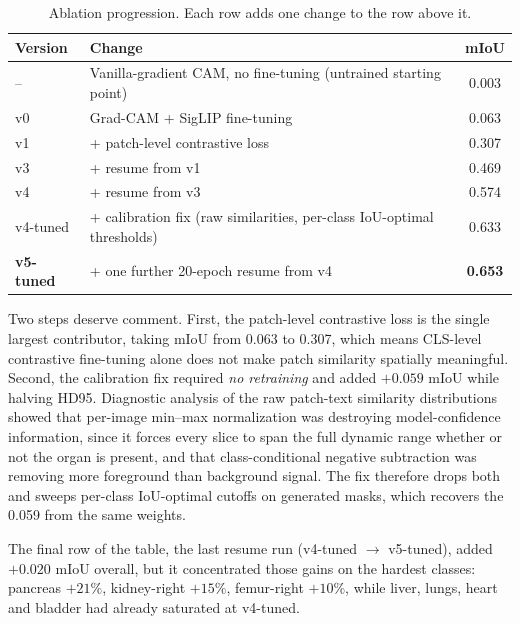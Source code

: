 \begin{table}[t]
\centering
\caption{Ablation progression. Each row adds one change to the row above it.}
\label{tab:progression}
\begin{tabular}{llc}
\toprule
Version & Change & mIoU \\
\midrule
--         & Vanilla-gradient CAM, no fine-tuning (untrained starting point) & 0.003 \\
v0         & Grad-CAM + SigLIP fine-tuning                                   & 0.063 \\
v1         & \quad + patch-level contrastive loss                            & 0.307 \\
v3         & \quad + resume from v1                                          & 0.469 \\
v4         & \quad + resume from v3                                          & 0.574 \\
v4-tuned   & \quad + calibration fix (raw similarities, per-class IoU-optimal thresholds) & 0.633 \\
\textbf{v5-tuned} & \quad + one further 20-epoch resume from v4              & \textbf{0.653} \\
\bottomrule
\end{tabular}
\end{table}

Two steps deserve comment. First, the patch-level contrastive loss is the single
largest contributor, taking mIoU from 0.063 to 0.307, which means CLS-level
contrastive fine-tuning alone does not make patch similarity spatially
meaningful. Second, the calibration fix required \emph{no retraining} and added
$+0.059$ mIoU while halving HD95. Diagnostic analysis of the raw patch-text
similarity distributions showed that per-image min--max normalization was
destroying model-confidence information, since it forces every slice to span the
full dynamic range whether or not the organ is present, and that
class-conditional negative subtraction was removing more foreground than
background signal. The fix therefore drops both and sweeps per-class IoU-optimal
cutoffs on generated masks, which recovers the 0.059 from the same weights.

The final row of the table, the last resume run (v4-tuned $\to$ v5-tuned), added
$+0.020$ mIoU overall, but it concentrated those gains on the hardest classes:
pancreas $+21\%$, kidney-right $+15\%$, femur-right $+10\%$, while liver, lungs,
heart and bladder had already saturated at v4-tuned.

